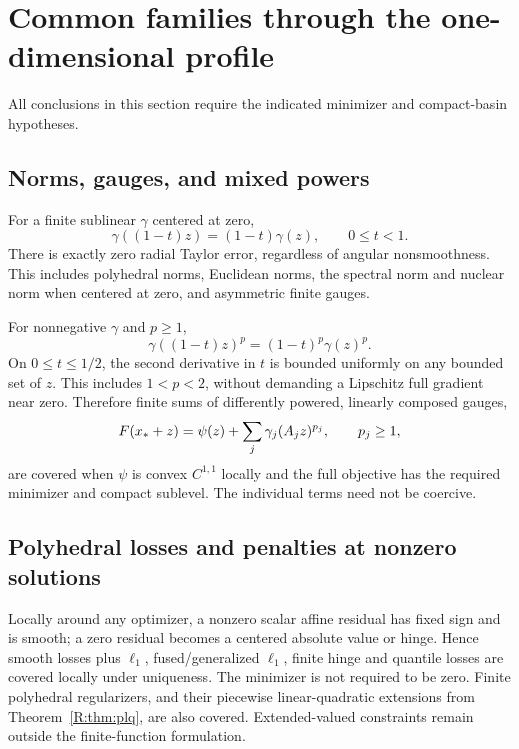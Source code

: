 \setcounter{section}{5}
\setcounter{theorem}{0}
\setcounter{equation}{8}


\section{Common families through the one-dimensional profile}
All conclusions in this section require the indicated minimizer and compact-basin hypotheses.



\subsection{Norms, gauges, and mixed powers}

For a finite sublinear $\gamma$ centered at zero,
\[
 \gamma((1-t)z)=(1-t)\gamma(z),\qquad 0\le t<1.
\]
There is exactly zero radial Taylor error, regardless of angular nonsmoothness. This includes polyhedral norms, Euclidean norms, the spectral norm and nuclear norm when centered at zero, and asymmetric finite gauges.

For nonnegative $\gamma$ and $p\ge1$,
\[
 \gamma((1-t)z)^p=(1-t)^p\gamma(z)^p.
\]
On $0\le t\le1/2$, the second derivative in $t$ is bounded uniformly on any bounded set of $z$. This includes $1<p<2$, without demanding a Lipschitz full gradient near zero. Therefore finite sums of differently powered, linearly composed gauges,
\[
 F(x_*+z)=\psi(z)+\sum_j\gamma_j(A_jz)^{p_j},\qquad p_j\ge1,
\]
are covered when $\psi$ is convex $C^{1,1}$ locally and the full objective has the required minimizer and compact sublevel. The individual terms need not be coercive.



\subsection{Polyhedral losses and penalties at nonzero solutions}
Locally around any optimizer, a nonzero scalar affine residual has fixed sign and is smooth; a zero residual becomes a centered absolute value or hinge. Hence smooth losses plus $\ell_1$, fused/generalized $\ell_1$, finite hinge and quantile losses are covered locally under uniqueness. The minimizer is not required to be zero. Finite polyhedral regularizers, and their piecewise linear-quadratic extensions from Theorem~\ref{R:thm:plq}, are also covered. Extended-valued constraints remain outside the finite-function formulation.

